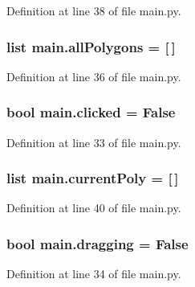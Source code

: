 Definition at line 38 of file main.\+py.

\subsubsection[{\texorpdfstring{all\+Polygons}{allPolygons}}]{\setlength{\rightskip}{0pt plus 5cm}list main.\+all\+Polygons = \mbox{[}$\,$\mbox{]}}\hypertarget{namespacemain_aefa0fded6ff7576348bd2abf3ab0f8a8}{}\label{namespacemain_aefa0fded6ff7576348bd2abf3ab0f8a8}


Definition at line 36 of file main.\+py.

\subsubsection[{\texorpdfstring{clicked}{clicked}}]{\setlength{\rightskip}{0pt plus 5cm}bool main.\+clicked = False}\hypertarget{namespacemain_adf37c1088b5a3b0bb91496b491b8a83c}{}\label{namespacemain_adf37c1088b5a3b0bb91496b491b8a83c}


Definition at line 33 of file main.\+py.

\subsubsection[{\texorpdfstring{current\+Poly}{currentPoly}}]{\setlength{\rightskip}{0pt plus 5cm}list main.\+current\+Poly = \mbox{[}$\,$\mbox{]}}\hypertarget{namespacemain_add5856c8a2f29c2a313d0a979f3f9386}{}\label{namespacemain_add5856c8a2f29c2a313d0a979f3f9386}


Definition at line 40 of file main.\+py.

\subsubsection[{\texorpdfstring{dragging}{dragging}}]{\setlength{\rightskip}{0pt plus 5cm}bool main.\+dragging = False}\hypertarget{namespacemain_afbd095805fe27d150b359c144b7ed863}{}\label{namespacemain_afbd095805fe27d150b359c144b7ed863}


Definition at line 34 of file main.\+py.

